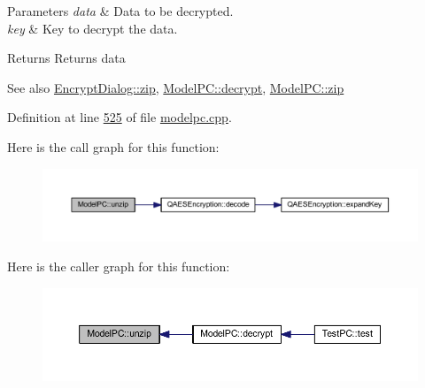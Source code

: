 \begin{DoxyParams}{Parameters}
{\em data} & Data to be decrypted. \\
\hline
{\em key} & Key to decrypt the data. \\
\hline
\end{DoxyParams}
\begin{DoxyReturn}{Returns}
Returns data 
\end{DoxyReturn}
\begin{DoxySeeAlso}{See also}
\mbox{\hyperlink{class_encrypt_dialog_a2bff820a3df4ddc36ecb07ed74b7138a}{Encrypt\+Dialog\+::zip}}, \mbox{\hyperlink{class_model_p_c_af1f0b21565bf39808c4cdd448fad0ea8}{Model\+P\+C\+::decrypt}}, \mbox{\hyperlink{class_model_p_c_afebbbfa4b07deba4f68fc6dfb50f353f}{Model\+P\+C\+::zip}} 
\end{DoxySeeAlso}


Definition at line \mbox{\hyperlink{modelpc_8cpp_source_l00525}{525}} of file \mbox{\hyperlink{modelpc_8cpp_source}{modelpc.\+cpp}}.

Here is the call graph for this function\+:
\nopagebreak
\begin{figure}[H]
\begin{center}
\leavevmode
\includegraphics[width=350pt]{class_model_p_c_a6da88f166785a49f73b22c169f956fd0_cgraph}
\end{center}
\end{figure}
Here is the caller graph for this function\+:
\nopagebreak
\begin{figure}[H]
\begin{center}
\leavevmode
\includegraphics[width=350pt]{class_model_p_c_a6da88f166785a49f73b22c169f956fd0_icgraph}
\end{center}
\end{figure}
\mbox{\label{class_model_p_c_afebbbfa4b07deba4f68fc6dfb50f353f}} 
